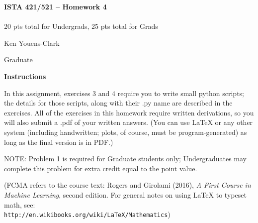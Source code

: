 \documentclass[10pt]{article}
\newcommand{\latex}{\LaTeX\xspace}
\begin{document}
\begin{center}
    {\Large {\bf ISTA 421/521 -- Homework 4}} \\
     \\
    20 pts total for Undergrads, 25 pts total for Grads\\
    
\end{center}

\begin{flushright}
Ken Youens-Clark

Graduate
\end{flushright}

\vspace{1cm}
{\Large {\bf Instructions}}

In this assignment, exercises 3 and 4 require you to write small python scripts; the details for those scripts, along with their .py name are described in the exercises.  All of the exercises in this homework require written derivations, so you will also submit a .pdf of your written answers.  (You can use \latex or any other system (including handwritten; plots, of course, must be program-generated) as long as the final version is in PDF.)


NOTE: Problem 1 is required for Graduate students only; Undergraduates may complete this problem for extra credit equal to the point value.

(FCMA refers to the course text: Rogers and Girolami (2016), {\em A First Course in Machine Learning}, second edition.  For general notes on using \latex to typeset math, see: \\{\tt http://en.wikibooks.org/wiki/LaTeX/Mathematics})
\vspace{.5cm}



\end{document}
